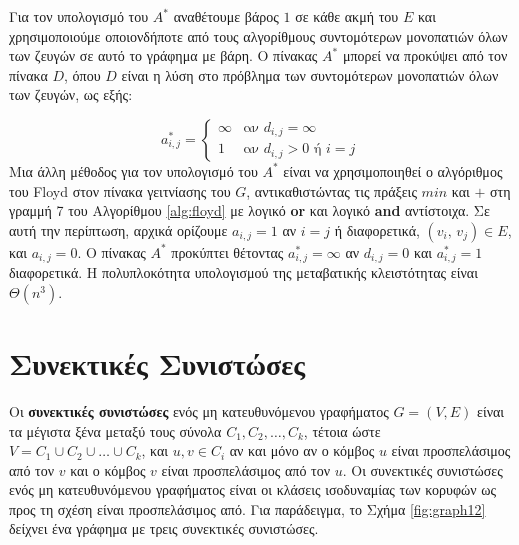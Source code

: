 \documentclass[12pt,a4paper]{article} %
\begin{document}
{{\indent Για τον υπολογισμό του $A^*$ αναθέτουμε βάρος $1$ σε κάθε
ακμή του $E$ και χρησιμοποιούμε οποιονδήποτε από τους αλγορίθμους
συντομότερων μονοπατιών όλων των ζευγών σε αυτό το γράφημα με βάρη.
Ο πίνακας $A^*$ μπορεί να προκύψει από τον πίνακα $D$, όπου $D$ είναι
η λύση στο πρόβλημα των συντομότερων μονοπατιών όλων των ζευγών,
ως εξής:

\[
a^*_{i,j} =
\begin{cases}
\infty & \text{αν } d_{i,j} = \infty \\
1      & \text{αν } d_{i,j} > 0 \text{ ή } i = j
\end{cases}
\]
Μια άλλη μέθοδος για τον υπολογισμό του $A^*$ είναι να χρησιμοποιηθεί
ο αλγόριθμος του Floyd στον πίνακα γειτνίασης του $G$, αντικαθιστώντας
τις πράξεις $min$ και $+$ στη γραμμή 7 του Αλγορίθμου \ref{alg:floyd} με
λογικό \textbf{or} και λογικό \textbf{and} αντίστοιχα. Σε αυτή την
περίπτωση, αρχικά ορίζουμε $a_{i,j} = 1$ αν $i = j$ ή διαφορετικά,
$(v_i,\, v_j) \in E$, και $a_{i,j} = 0$. Ο πίνακας $A^*$
προκύπτει θέτοντας $a^*_{i,j} = \infty$ αν $d_{i,j} = 0$ και
$a^*_{i,j} = 1$ διαφορετικά. Η πολυπλοκότητα υπολογισμού της
μεταβατικής κλειστότητας είναι $\Theta(n^3)$.
\vspace{0.3cm}
\section{Συνεκτικές Συνιστώσες}

Οι \textbf{συνεκτικές συνιστώσες} ενός μη κατευθυνόμενου γραφήματος $G = (V, E)$
είναι τα μέγιστα ξένα μεταξύ τους σύνολα $C_1, C_2, \ldots, C_k$, τέτοια ώστε
$V = C_1 \cup C_2 \cup \ldots \cup C_k$, και $u, v \in C_i$ αν και μόνο αν ο
κόμβος $u$ είναι προσπελάσιμος από τον $v$ και ο κόμβος $v$ είναι
προσπελάσιμος από τον $u$. Οι συνεκτικές συνιστώσες ενός μη κατευθυνόμενου
γραφήματος είναι οι κλάσεις ισοδυναμίας των κορυφών ως προς τη σχέση
\guillemotleft είναι προσπελάσιμος από\guillemotright. Για παράδειγμα, το Σχήμα \ref{fig:graph12} δείχνει ένα
γράφημα με τρεις συνεκτικές συνιστώσες.

\begin{figure}[H]
\centering
{}
\end{figure}}}
\end{document}

